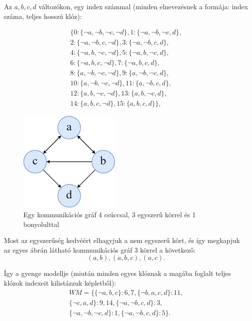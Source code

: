 \documentclass[
]{thesis-ekf}
\theoremstyle{definition}
\theoremstyle{remark}
\begin{document}
	 Az $ {a,b,c,d} $ változókon, egy index számmal (minden elnevezésnek a formája: index száma, teljes hosszú klóz):
	
	\begin{equation}\label{eq-teljes-klozok}
		\begin{split}
			\{0:\{\neg a,\neg b,\neg c,\neg d\},1:\{\neg a,\neg b,\neg c,d\}, \\
			2:\{\neg a,\neg b,c,\neg d\},3:\{\neg a,\neg b,c,d\}, \\
			4:\{\neg a,b,\neg c,\neg d\},5:\{\neg a,b,\neg c,d\}, \\
			6:\{\neg a,b,c,\neg d\},7:\{\neg a,b,c,d\}, \\
			8:\{a,\neg b,\neg c,\neg d\},9:\{a,\neg b,\neg c,d\}, \\
			10:\{a,\neg b,\neg c,\neg d\},11:\{a,\neg b,c,d\}, \\
			12:\{a,b,\neg c,\neg d\},13:\{a,b,\neg c,d\}, \\
			14:\{a,b,c,\neg d\},15:\{a,b,c,d\}\},
		\end{split}
	\end{equation}
				
	\begin{figure}[h]
		\centering
		\includegraphics[width=5cm]{images/SYNASC2020_4node_7edge}
		\caption{Egy kommunikációs gráf 4 csúccsal, 3 egyszerű körrel és 1 bonyolulttal}
		\label{abra-synasc2020-4node7edge}
	\end{figure}

	Most az egyszerűség kedvéért elhagyjuk a nem egyszerű kört, és így megkapjuk az egyes ábrán látható  kommunikációs gráf 3 körrel a következő:
	\[ (a,b),(a,b,c),(a,c). \]
	
	Így a gyenge modellje (miután minden egyes klóznak a magába foglalt teljes klózok indexeit kilistázzuk \az{\eqref{eq-teljes-klozok}} képletből):
	\begin{equation*}
		\begin{split}
			WM=\{\{\neg a,b,c\} :6,7,\{\neg b,a,c,d\} :11, \\
			\{\neg c,a,d\} :9,14,\{\neg a,\neg b,c,d\} :3, \\
			\{\neg a,\neg b,\neg c,d\} :1,\{\neg a,\neg b,c,d\} :5\}. \\
		\end{split}
	\end{equation*}
\end{document}

